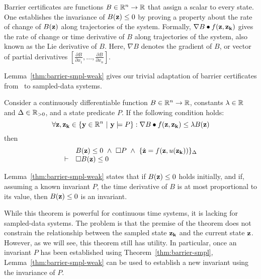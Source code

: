 Barrier certificates are functions $B \in \mathbb{R}^n \rightarrow \mathbb{R}$ that assign
a scalar to every state. One establishes the invariance of $B(\mathbf{z})
\leq 0$ by proving a property about the rate of change of $B(\mathbf{z})$
along trajectories of the system. Formally, $\nabla B \bullet
f(\mathbf{z},\mathbf{z_k})$ gives the rate of change or time derivative
of $B$ along trajectories of the system, also known as the Lie derivative
of $B$. Here, $\nabla B$ denotes the gradient of $B$, or vector of partial
derivatives $[\frac{\partial B}{\partial x_1},\ldots,\frac{\partial
    B}{\partial x_n}]$.

Lemma~\ref{thm:barrier-smpl-weak} gives our trivial adaptation of barrier
certificates from~\cite{kong2013barrier} to sampled-data systems.

\begin{lemma}
Consider a continuously differentiable function $B \in \mathbb{R}^n \rightarrow
\mathbb{R}$, constants $\lambda \in \mathbb{R}$ and $\Delta \in \mathbb{R}_{> 0}$, and a state
predicate $P$. If the following condition holds:
\[
\forall \mathbf{z}, \mathbf{z_k} \in \{\mathbf{y} \in \mathbb{R}^n~|~\mathbf{y} \models P\} : \nabla B \bullet f(\mathbf{z},\mathbf{z_k}) \leq \lambda B(\mathbf{z})
\]
then
\[
\begin{array}{cl}
&
B(\mathbf{z}) \leq 0~\wedge~
\Box{} P~\wedge~
\{\dot{\mathbf{z}} = f(\mathbf{z},u(\mathbf{z_k}))\}_{\Delta} \\
\vdash
&
\Box{} B(\mathbf{z}) \leq 0
\end{array}
\]
\label{thm:barrier-smpl-weak}
\end{lemma}

Lemma~\ref{thm:barrier-smpl-weak} states that if $B(\mathbf{z}) \leq 0$
holds initially, and if, assuming a known invariant $P$, the time
derivative of $B$ is at most proportional to its value, then
$B(\mathbf{z}) \leq 0$ is an invariant.

While this theorem is powerful for continuous time systems, it is lacking
for sampled-data systems. The problem is that the premise of the theorem
does not constrain the relationship between the sampled state
$\mathbf{z_k}$ and the current state $\mathbf{z}$. However, as we will
see, this theorem still has utility. In particular, once an invariant $P$
has been established using Theorem~\ref{thm:barrier-smpl},
Lemma~\ref{thm:barrier-smpl-weak} can be used to establish a new invariant
using the invariance of $P$.

